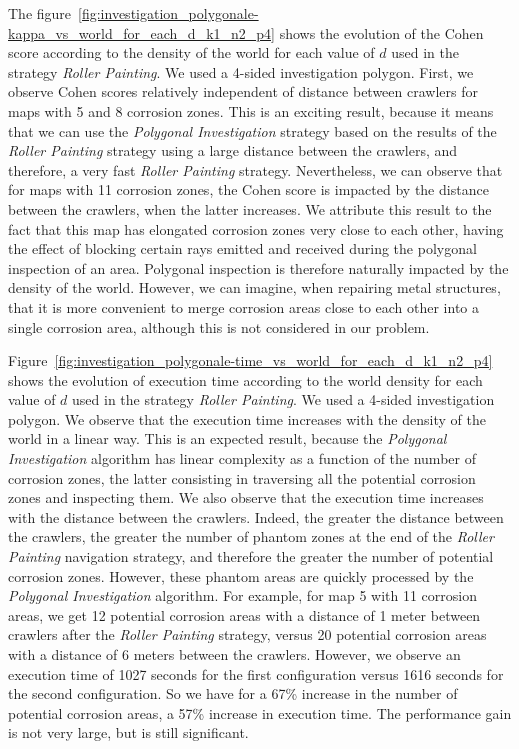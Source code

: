 \documentclass[english,RandD]{rapportPFE}  %
\begin{document}
			The figure~\ref{fig:investigation_polygonale-kappa_vs_world_for_each_d_k1_n2_p4} shows the evolution of the Cohen score according to the density of the world for each value of $d$ used in the strategy \textit{Roller Painting}.
			We used a 4-sided investigation polygon.
			First, we observe Cohen scores relatively independent of distance between crawlers for maps with 5 and 8 corrosion zones.
			This is an exciting result, because it means that we can use the \textit{Polygonal Investigation} strategy based on the results of the \textit{Roller Painting} strategy using a large distance between the crawlers, and therefore, a very fast \textit{Roller Painting} strategy.
			Nevertheless, we can observe that for maps with 11 corrosion zones, the Cohen score is impacted by the distance between the crawlers, when the latter increases.
			We attribute this result to the fact that this map has elongated corrosion zones very close to each other, having the effect of blocking certain rays emitted and received during the polygonal inspection of an area.
			Polygonal inspection is therefore naturally impacted by the density of the world.
			However, we can imagine, when repairing metal structures, that it is more convenient to merge corrosion areas close to each other into a single corrosion area, although this is not considered in our problem.

			Figure~\ref{fig:investigation_polygonale-time_vs_world_for_each_d_k1_n2_p4} shows the evolution of execution time according to the world density for each value of $d$ used in the strategy \textit{Roller Painting}.
			We used a 4-sided investigation polygon.
			We observe that the execution time increases with the density of the world in a linear way.
			This is an expected result, because the \textit{Polygonal Investigation} algorithm has linear complexity as a function of the number of corrosion zones, the latter consisting in traversing all the potential corrosion zones and inspecting them.
			We also observe that the execution time increases with the distance between the crawlers.
			Indeed, the greater the distance between the crawlers, the greater the number of phantom zones at the end of the \textit{Roller Painting} navigation strategy, and therefore the greater the number of potential corrosion zones.
			However, these phantom areas are quickly processed by the \textit{Polygonal Investigation} algorithm.
			For example, for map 5 with 11 corrosion areas, we get 12 potential corrosion areas with a distance of 1 meter between crawlers after the \textit{Roller Painting} strategy, versus 20 potential corrosion areas with a distance of 6 meters between the crawlers.
			However, we observe an execution time of 1027 seconds for the first configuration versus 1616 seconds for the second configuration.
			So we have for a 67\% increase in the number of potential corrosion areas, a 57\% increase in execution time.
			The performance gain is not very large, but is still significant.
\end{document}
